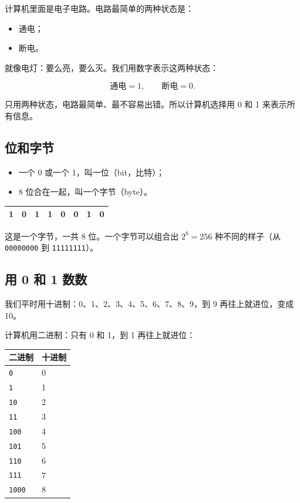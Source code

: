 计算机里面是电子电路。电路最简单的两种状态是：

\begin{itemize}
  \item 通电；
  \item 断电。
\end{itemize}

就像电灯：要么亮，要么灭。我们用数字表示这两种状态：

\[
\text{通电} = 1, \qquad \text{断电} = 0.
\]

只用两种状态，电路最简单、最不容易出错。所以计算机选择用 0 和 1 来表示所有信息。

\subsection{位和字节}

\begin{itemize}
  \item 一个 0 或一个 1，叫一位（bit，比特）；
  \item 8 位合在一起，叫一个字节（byte）。
\end{itemize}

\begin{center}
\begin{tabular}{@{}cccccccc@{}}
\toprule
1 & 0 & 1 & 1 & 0 & 0 & 1 & 0 \\
\bottomrule
\end{tabular}
\end{center}

这是一个字节，一共 8 位。一个字节可以组合出 $2^8 = 256$ 种不同的样子（从 \texttt{00000000} 到 \texttt{11111111}）。

\subsection{用 0 和 1 数数}

我们平时用十进制：0、1、2、3、4、5、6、7、8、9，到 9 再往上就进位，变成 10。

计算机用二进制：只有 0 和 1，到 1 再往上就进位：

\begin{center}
\begin{tabular}{@{}ll@{}}
\toprule
二进制 & 十进制 \\
\midrule
\texttt{0} & 0 \\
\texttt{1} & 1 \\
\texttt{10} & 2 \\
\texttt{11} & 3 \\
\texttt{100} & 4 \\
\texttt{101} & 5 \\
\texttt{110} & 6 \\
\texttt{111} & 7 \\
\texttt{1000} & 8 \\
\bottomrule
\end{tabular}
\end{center}

